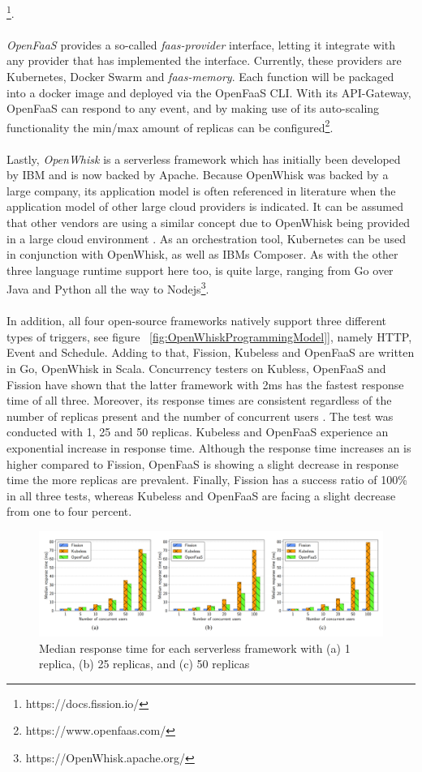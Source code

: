 \documentclass[11pt]{article}
\begin{document}
\footnote{https://docs.fission.io/}.\\\\ \textit{OpenFaaS} provides a so-called \textit{faas-provider} interface, letting it integrate with any provider that has implemented the interface. Currently, these providers are Kubernetes, Docker Swarm and \textit{faas-memory}. Each function will be packaged into a docker image and deployed via the OpenFaaS CLI. With its API-Gateway, OpenFaaS can respond to any event, and by making use of its auto-scaling functionality the min/max amount of replicas can be configured\footnote{https://www.openfaas.com/}.\\\\ Lastly, \textit{OpenWhisk} is a serverless framework which has initially been developed by IBM and is now backed by Apache. Because OpenWhisk was backed by a large company, its application model is often referenced in literature when the application model of other large cloud providers is indicated. It can be assumed that other vendors are using a similar concept due to OpenWhisk being provided in a large cloud environment \cite{van2019spec}. As an orchestration tool, Kubernetes can be used in conjunction with OpenWhisk, as well as IBMs Composer. As with the other three language runtime support here too, is quite large, ranging from Go over Java and Python all the way to Nodejs\footnote{https://OpenWhisk.apache.org/}.\\\\ In addition,  all four open-source frameworks natively support three different types of triggers, see figure ~\ref{fig:OpenWhiskProgrammingModel}], namely HTTP, Event and Schedule. Adding to that, Fission, Kubeless and OpenFaaS are written in Go, OpenWhisk in Scala. Concurrency testers on Kubless, OpenFaaS and Fission have shown that the latter framework with 2ms has the fastest response time of all three. Moreover, its response times are consistent regardless of the number of replicas present and the number of concurrent users \cite{mohanty2018evaluation}. The test was conducted with 1, 25 and 50 replicas. Kubeless and OpenFaaS experience an exponential increase in response time. Although the response time increases an is higher compared to Fission, OpenFaaS is showing a slight decrease in response time the more replicas are prevalent. Finally, Fission has a success ratio of 100\% in all three tests, whereas Kubeless and OpenFaaS are facing a slight decrease from one to four percent.
\begin{figure}[H]
\caption{Median response time for each serverless framework with (a) 1 replica, (b) 25 replicas, and (c) 50 replicas \cite{mohanty2018evaluation}}
\label{fig:opensource}
\centering
\includegraphics[width=1\textwidth]{opensource}
\end{figure}
\end{document}
